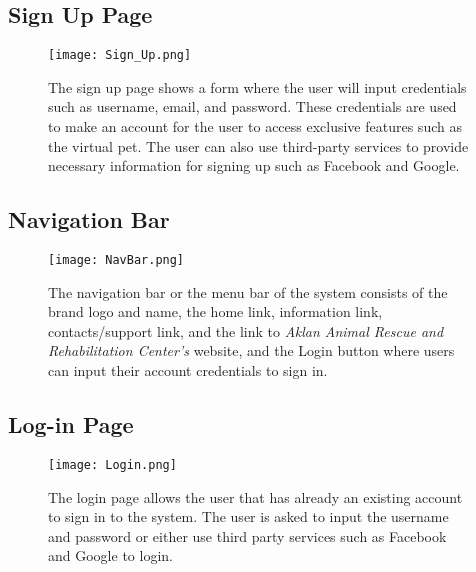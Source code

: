 \subsection{Sign Up Page}
\begin{figure}[H]                %
	\centering                    %
	\texttt{[image: Sign\_Up.png]}      %
	\caption{
		The sign up page shows a form where the user will input credentials such as username, email, and password. These credentials are used to make an account for the user to access exclusive features such as the virtual pet. The user can also use third-party services to provide necessary information for signing up such as Facebook and Google.}
	\label{fig:Sign_Up}
\end{figure}

\subsection{Navigation Bar}
\begin{figure}[H]                %
	\centering                    %
	\texttt{[image: NavBar.png]}      %
	\caption{
	The navigation bar or the menu bar of the system consists of the brand logo and name, the home link, information link, contacts/support link, and the link to \emph{Aklan Animal Rescue and Rehabilitation Center’s} website, and the Login button where users can input their account credentials to sign in.}
	\label{fig:Navigation}
\end{figure}

\subsection{Log-in Page}
\begin{figure}[H]                %
	\centering                    %
	\texttt{[image: Login.png]}      %
	\caption{
	The login page allows the user that has already an existing account to sign in to the system. The user is asked to input the username and password or either use third party services such as Facebook and Google to login.}
	\label{fig:Login}
\end{figure}

